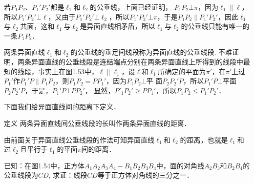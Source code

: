   若$P_1P_2$、$P_1'P_2'$都是$\ell_1$和$\ell_2$的公垂线，上面已经证明，
  $P_1P_2\bot\pi$，因为$\ell_1\parallel \ell$，所以$P_1'P_2'\bot\ell$，又由于$P_1'P_2'\bot \ell_2$，所以$P_1'P_2'\bot \pi$，于是$P_1P_2\parallel P_1'P_2'$，因此$\ell_1$与$\ell_2$共面，这和$\ell_1$与$\ell_2$是异面直线相矛盾，所以$\ell_1$与$\ell_2$的公垂线只能有唯一的一条$P_1P_2$．
  
  两条异面直线$\ell_1$和$\ell_2$的公垂线的垂足间线段称为异面直线的公垂线段. 不难证明，两条异面直线的公垂线段是连结端点分别在两条异面直线上所得到的线段中最短的线段，事实上在图1.53中，$\ell\parallel \ell_1$，设$\ell$和$\ell_1$所确定的平面为$\pi'$，在$\pi'$上过$P_1'$作$P_1'P\parallel P_1P_2$，则$P_1P_2=PP_1'$，因为$P_1P_2\bot $平
  面$P_2P_2'P$，所以$P_1'P\bot $平面$P_2P_2'P$，于是，$P_1'P\bot PP_2'$，
  显然，$P'_1P_2'\ge PP_1'$，所以$P_1P_2\le P_1'P_2'$．
  
    
  

下面我们给异面直线间的距离下定义．

\begin{blk}
  {定义} 两条异面直线间公垂线段的长叫作两条异面直线的距离．
\end{blk}


由前面关于异面直线公垂线段的作法可知异面直线$\ell_1$和$\ell_2$的距离，也就是$\ell_1$和过$\ell_2$且平行于$\ell_1$的平面$\pi$间的距离．

\begin{example}
  已知：在图1.54中，正方体$A_1A_2A_3A_4-B_1B_2B_3B_4$中，面的对角线$A_2B_3$和$B_2B_4$的公垂线段为$CD$, 求证：线段$CD$等于正方体对角线的三分之一．
\end{example}

\begin{figure}[htp]
  \centering
{}
  \caption{}
\end{figure}


